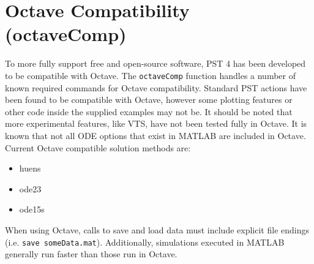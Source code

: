 \section{Octave Compatibility (octaveComp)}
To more fully support free and open-source software, PST 4 has been developed to be compatible with Octave.
The \verb|octaveComp| function handles a number of known required commands for Octave compatibility.
Standard PST actions have been found to be compatible with Octave, however some plotting features or other code inside the supplied examples may not be.
It should be noted that more experimental features, like VTS, have not been tested fully in Octave.
It is known that not all ODE options that exist in MATLAB are included in Octave.
Current Octave compatible solution methods are:
\begin{itemize}
 em
\singlespacing
\item huens
\item ode23
\item ode15s
\end{itemize}
When using Octave, calls to save and load data must include explicit file endings (i.e. \verb|save someData.mat|).
Additionally, simulations executed in MATLAB generally run faster than those run in Octave.

